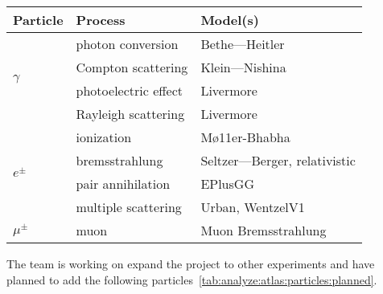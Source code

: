 \begin{table}[ht]
    \centering
    \begin{tabular}{lll}
        \hline
        \textbf{Particle}         & \textbf{Process}     & \textbf{Model(s)}            \\
        \hline
        \multirow{4}{*}{$\gamma$} & photon conversion    & Bethe—Heitler                \\
                                  & Compton scattering   & Klein—Nishina                \\
                                  & photoelectric effect & Livermore                    \\
                                  & Rayleigh scattering  & Livermore                    \\
        \hline
        \multirow{4}{*}{$e^\pm$}  & ionization           & Mø11er-Bhabha                \\
                                  & bremsstrahlung       & Seltzer—Berger, relativistic \\
                                  & pair annihilation    & EPlusGG                      \\
                                  & multiple scattering  & Urban, WentzelV1             \\
        \hline
        $\mu^\pm$                 & muon                 & Muon Bremsstrahlung          \\
        \hline
    \end{tabular}
    \label{tab:analyze:atlas:particles:implemented}
\end{table}

The team is working on expand the project to other experiments and have planned
to add the following particles~\ref{tab:analyze:atlas:particles:planned}.


